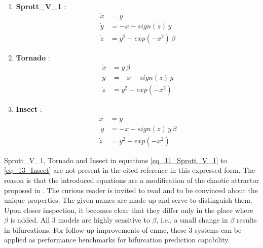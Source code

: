 \begin{enumerate}
    \item \textbf{Sprott\_V\_1} \cite{sprott2020we}:
    \begin{equation}
        \label{eq_11_Sprott_V_1}
        \begin{aligned}
            \dot x &= y \\
            \dot y &= -x - sign(z)\,y\\
            \dot z &= y^2 - exp(-x^2) \, \beta
        \end{aligned}
    \end{equation}


    \item \textbf{Tornado} \cite{sprott2020we}:
    \begin{equation}
        \label{eq_12_Tornado}
        \begin{aligned}
            \dot x &= y \, \beta \\
            \dot y &= -x - sign(z)\,y\\
            \dot z &= y^2 - exp(-x^2) 
        \end{aligned}
    \end{equation}


    \item \textbf{Insect} \cite{sprott2020we}:
    \begin{equation}
        \label{eq_13_Insect}
        \begin{aligned}
            \dot x &= y \\\
            \dot y &= -x - sign(z)\,y \, \beta\\
            \dot z &= y^2 - exp(-x^2) 
        \end{aligned}
    \end{equation}


\end{enumerate}

Sprott\_V\_1, Tornado and Insect in equations \eqref{eq_11_Sprott_V_1} to \eqref{eq_13_Insect} are not present in the cited reference \cite{sprott2020we} in this expressed form. 
The reason is that the introduced equations are a modification of the chaotic attractor proposed in \cite{sprott2020we}. The curious reader is invited to read \cite{sprott2020we} and to be convinced about the unique properties.
The given names are made up and serve to distinguish them. 
Upon closer inspection, it becomes clear that they differ only in the place where $\beta$ is added. 
All 3 models are highly sensitive to $\beta $, i.e., a small change in $\beta $ results in bifurcations. 
For follow-up improvements of \gls{cnmc}, these 3 systems can be applied as performance benchmarks for bifurcation prediction capability.\newline 


